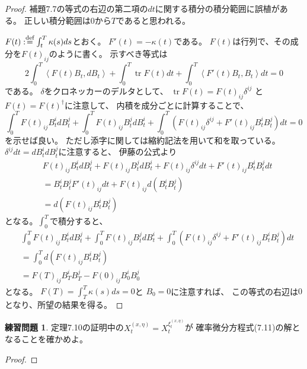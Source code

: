 \documentclass[uplatex]{jsarticle}
\theoremstyle{definition}
\newtheorem{prob}[prob]{練習問題}
\DeclareMathOperator{\tr}{\mathrm{tr}}
\def\dfn{:\overset{\mbox{{\scriptsize def}}}{=}}
\begin{document}
\begin{proof}
  補題7.7の等式の右辺の第二項の\(dt\)に関する積分の積分範囲に誤植がある。
  正しい積分範囲は\(0\)から\(T\)であると思われる。

  \(F(t) \dfn \int_t^T \kappa(s)ds\)とおく。
  \(F'(t) = -\kappa(t)\)である。
  \(F(t)\)は行列で、その成分を\(F(t)_{ij}\)のように書く。
  示すべき等式は
  \[
  2\int_0^T\left< F(t)B_t, dB_t\right>
  + \int_0^T\tr F(t) dt + \int_0^T \left< F'(t)B_t, B_t\right> dt = 0
  \]
  である。
  \(\delta\)をクロネッカーのデルタとして、
  \(\tr F(t) = F(t)_{ij}\delta^{ij}\)
  と\(F(t) = F(t)^\dagger\)に注意して、
  内積を成分ごとに計算することで、
  \[
  \int_0^T F(t)_{ij}B_t^i dB_t^j + \int_0^T F(t)_{ij}B_t^j dB_t^i
  + \int_0^T \left( F(t)_{ij}\delta^{ij} + F'(t)_{ij}B_t^iB_t^j \right)dt = 0
  \]
  を示せば良い。
  ただし添字に関しては縮約記法を用いて和を取っている。
  \(\delta^{ij}dt = dB_t^idB_t^j\)に注意すると、
  伊藤の公式より
  \begin{align*}
    &F(t)_{ij}B_t^i dB_t^j + F(t)_{ij}B_t^j dB_t^i
    + F(t)_{ij}\delta^{ij}dt + F'(t)_{ij}B_t^iB_t^jdt \\
    &= B_t^iB_t^jF'(t)_{ij}dt + F(t)_{ij}d (B_t^iB_t^j) \\
    &= d\left( F(t)_{ij}B_t^iB_t^j\right)
  \end{align*}
  となる。\(\int_0^T\)で積分すると、
  \begin{align*}
    &\int_0^T F(t)_{ij}B_t^i dB_t^j + \int_0^T F(t)_{ij}B_t^j dB_t^i
    + \int_0^T \left( F(t)_{ij}\delta^{ij} + F'(t)_{ij}B_t^iB_t^j \right)dt \\
    &= \int_0^T d\left( F(t)_{ij}B_t^iB_t^j\right) \\
    &= F(T)_{ij}B_T^iB_T^j - F(0)_{ij}B_0^iB_0^j
  \end{align*}
  となる。
  \(F(T) = \int_T^T\kappa(s)ds = 0\)と
  \(B_0=0\)に注意すれば、
  この等式の右辺は\(0\)となり、所望の結果を得る。
\end{proof}






\begin{prob}\label{prob: 7.5}
  定理7.10の証明中の\(X_t^{(x,\eta)} = X_t^{\xi_t^{(x,\eta)}}\)が
  確率微分方程式(7.11)の解となることを確かめよ。
\end{prob}

\begin{proof}

\end{proof}
\end{document}
